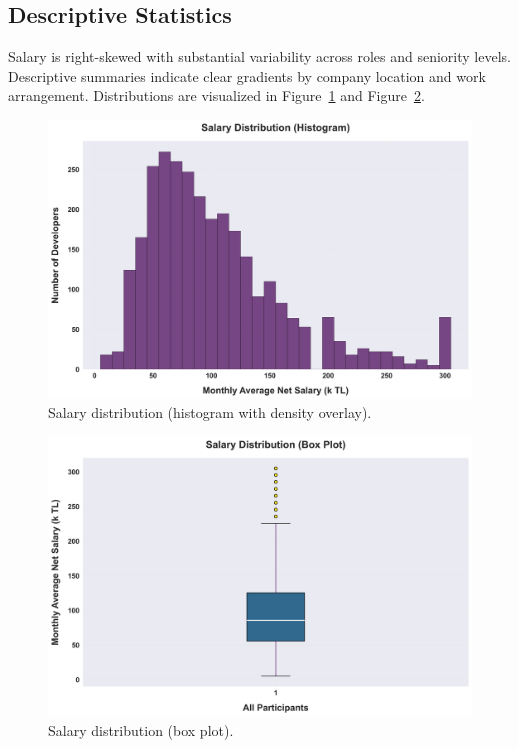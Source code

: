 \subsection{Descriptive Statistics}
Salary is right-skewed with substantial variability across roles and seniority levels. Descriptive summaries indicate clear gradients by company location and work arrangement. Distributions are visualized in Figure~\ref{fig:salary-dist} and Figure~\ref{fig:salary-box}.

\begin{figure}[H]
  \centering
  \includegraphics[width=0.85\linewidth]{figures/01_maas_dagilimi_histogram.png}
  \caption{Salary distribution (histogram with density overlay).}
  \label{fig:salary-dist}
\end{figure}

\begin{figure}[H]
  \centering
  \includegraphics[width=0.85\linewidth]{figures/02_maas_dagilimi_boxplot.png}
  \caption{Salary distribution (box plot).}
  \label{fig:salary-box}
\end{figure}


